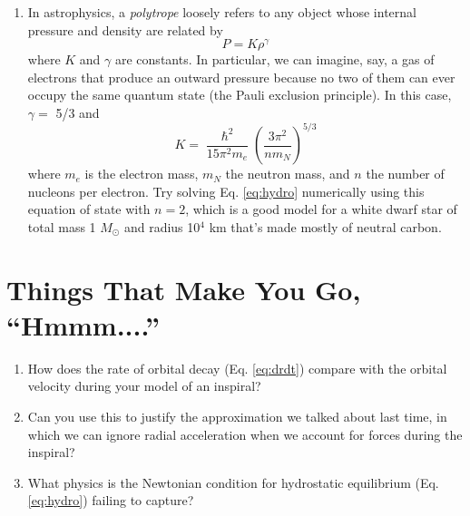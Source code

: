 \documentclass[11pt]{article}
\begin{document}
\begin{enumerate}
\item In astrophysics, a \textit{polytrope} loosely refers to any object whose internal pressure and density are related by
\begin{equation}\label{eq:polytrope}
P = K \rho^{\gamma}
\end{equation}
where $K$ and $\gamma$ are constants. In particular, we can imagine, say, a gas of electrons that produce an outward pressure because no two of them can ever occupy the same quantum state (the Pauli exclusion principle). In this case, $\gamma =$ 5/3 and
\[ K = \frac{\hslash^2}{15\pi^2 m_e} \left( \frac{3\pi^2}{n m_N} \right)^{5/3} \]
where $m_e$ is the electron mass, $m_N$ the neutron mass, and $n$ the number of nucleons per electron. Try solving Eq. \ref{eq:hydro} numerically using this equation of state with $n=2$, which is a good model for a white dwarf star of total mass 1 $M_{\odot}$ and radius 10$^4$ km that's made mostly of neutral carbon.

\end{enumerate}


\section*{Things That Make You Go, ``Hmmm....''}

\begin{enumerate}

\item How does the rate of orbital decay (Eq. \ref{eq:drdt}) compare with the orbital velocity during your model of an inspiral?

\item Can you use this to justify the approximation we talked about last time, in which we can ignore radial acceleration when we account for forces during the inspiral?

\item What physics is the Newtonian condition for hydrostatic equilibrium (Eq. \ref{eq:hydro}) failing to capture?

\end{enumerate}
\end{document}
